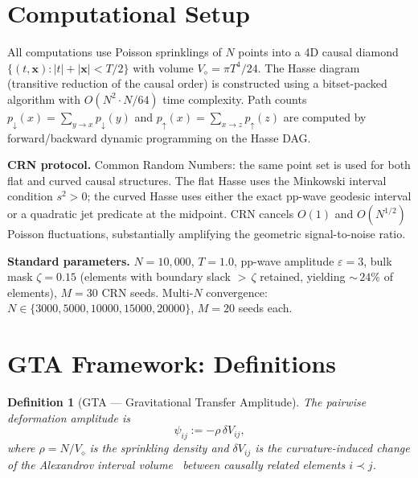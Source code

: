 \documentclass[12pt,a4paper]{article}
\newtheorem{definition}{Definition}
\begin{document}
\section{Computational Setup}

All computations use Poisson sprinklings of $N$ points into a 4D causal diamond $\{(t,\mathbf{x}): |t| + |\mathbf{x}| < T/2\}$ with volume $V_\diamond = \pi T^4/24$.
The Hasse diagram (transitive reduction of the causal order) is constructed using a bitset-packed algorithm with $O(N^2 \cdot N/64)$ time complexity.
Path counts $p_\downarrow(x) = \sum_{y \to x} p_\downarrow(y)$ and $p_\uparrow(x) = \sum_{x \to z} p_\uparrow(z)$ are computed by forward/backward dynamic programming on the Hasse DAG.

\textbf{CRN protocol.}
Common Random Numbers: the same point set is used for both flat and curved causal structures. The flat Hasse uses the Minkowski interval condition $s^2 > 0$; the curved Hasse uses either the exact pp-wave geodesic interval or a quadratic jet predicate at the midpoint. CRN cancels $O(1)$ and $O(N^{1/2})$ Poisson fluctuations, substantially amplifying the geometric signal-to-noise ratio.

\textbf{Standard parameters.}
$N = 10{,}000$, $T = 1.0$, pp-wave amplitude $\varepsilon = 3$, bulk mask $\zeta = 0.15$ (elements with boundary slack ${>}\,\zeta$ retained, yielding ${\sim}\,24\%$ of elements), $M = 30$ CRN seeds. Multi-$N$ convergence: $N \in \{3000, 5000, 10000, 15000, 20000\}$, $M = 20$ seeds each.

\section{GTA Framework: Definitions}

\begin{definition}[GTA --- Gravitational Transfer Amplitude]
The pairwise deformation amplitude is
\begin{equation}
  \psi_{ij} := -\rho\,\delta V_{ij},
\end{equation}
where $\rho = N/V_\diamond$ is the sprinkling density and $\delta V_{ij}$ is the curvature-induced change of the Alexandrov interval volume~\cite{GS2007} between causally related elements $i \prec j$.
\end{definition}
\end{document}

